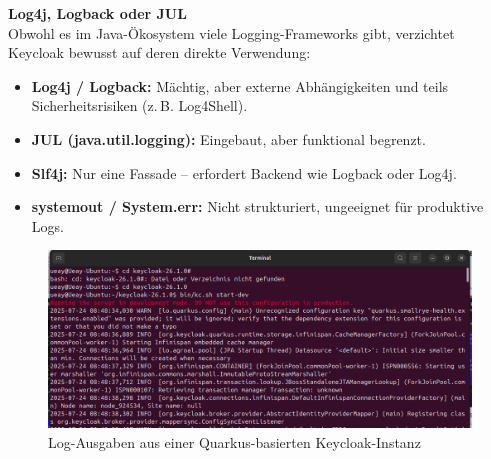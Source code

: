 \documentclass[a4paper,12pt]{article}
\begin{document}
	\vspace{0.5em}
	\textbf{Log4j, Logback oder JUL}\\
	Obwohl es im Java-Ökosystem viele Logging-Frameworks gibt, verzichtet Keycloak bewusst auf deren direkte Verwendung:
	\begin{itemize}
		\item \textbf{Log4j / Logback:} Mächtig, aber externe Abhängigkeiten und teils Sicherheitsrisiken (z.\,B. Log4Shell).
		\item \textbf{JUL (java.util.logging):} Eingebaut, aber funktional begrenzt.
		\item \textbf{Slf4j:} Nur eine Fassade – erfordert Backend wie Logback oder Log4j.
		\item \textbf{\gls{systemout} / System.err:} Nicht strukturiert, ungeeignet für produktive Logs.
	\end{itemize}
	
	\begin{figure}[H]
		\centering
		\includegraphics[width=1.1\linewidth]{Bilder/screenshot014}
		\caption{Log-Ausgaben aus einer Quarkus-basierten Keycloak-Instanz}
		\label{fig:screenshot014}
	\end{figure}
	
\end{document}
